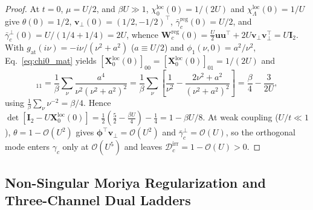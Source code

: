 \documentclass[11pt,a4paper]{article}
\numberwithin{equation}{section}
\theoremstyle{plain}
\theoremstyle{definition}
\begin{document}
\begin{proof}
At $t = 0$, $\mu = U/2$, and $\beta U \gg 1$, $\chi_0^{\mathrm{loc}}(0) = 1/(2U)$ and
$\chi_\Lambda^{\mathrm{loc}}(0) = 1/U$ give $\theta(0) = 1/2$,
$\mathbf{v}_\perp(0) = (1/2,-1/2)^\top$, $\bar{\gamma}_c^{\mathrm{reg}}(0) = U/2$, and
$\bar{\gamma}_c^\perp(0) = U/(1/4 + 1/4) = 2U$, whence
$\mathbf{W}_c^{\mathrm{reg}}(0) = \frac{U}{2}\mathbf{u}\mathbf{u}^\top + 2U\mathbf{v}_\perp\mathbf{v}_\perp^\top = U\mathbf{I}_2$.
With $g_{\mathrm{at}}(i\nu) = -i\nu/(\nu^2 + a^2)$ ($a \equiv U/2$) and
$\phi_1(\nu,0) = a^2/\nu^2$, Eq.~\eqref{eq:chi0_mat} yields
$[\mathbf{X}_0^{\mathrm{loc}}(0)]_{00} = [\mathbf{X}_0^{\mathrm{loc}}(0)]_{01} = 1/(2U)$
and
\begin{equation}
    [\mathbf{X}_0^{\mathrm{loc}}(0)]_{11}
    = \frac{1}{\beta}\sum_{\nu}\frac{a^4}{\nu^2(\nu^2+a^2)^2}
    = \frac{1}{\beta}\sum_{\nu}\left[\frac{1}{\nu^2} - \frac{2\nu^2+a^2}{(\nu^2+a^2)^2}\right]
    = \frac{\beta}{4} - \frac{3}{2U},
\end{equation}
using $\frac{1}{\beta}\sum_\nu \nu^{-2} = \beta/4$. Hence
$\det[\mathbf{I}_2 - U\mathbf{X}_0^{\mathrm{loc}}(0)] = \frac{1}{2}(\frac{5}{2} - \frac{\beta U}{4}) - \frac{1}{4} = 1 - \beta U/8$.
At weak coupling ($U/t \ll 1$), $\theta = 1 - \mathcal{O}(U^2)$ gives
$\boldsymbol{\phi}^\top\mathbf{v}_\perp = \mathcal{O}(U^2)$ and $\bar{\gamma}_c^\perp = \mathcal{O}(U)$,
so the orthogonal mode enters $\gamma_c$ only at $\mathcal{O}(U^5)$ and leaves
$\mathcal{D}_c^{\mathrm{irr}} = 1 - \mathcal{O}(U) > 0$.
\end{proof}

\subsection{Non-Singular Moriya Regularization and Three-Channel Dual Ladders}
\label{sec:moriya_3ch}
\end{document}
